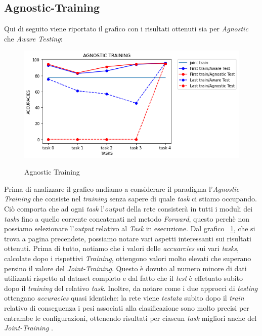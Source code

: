 \subsection{Agnostic-Training}
Qui di seguito  viene riportato il grafico con i risultati ottenuti sia per \textit{Agnostic} che \textit{Aware Testing}: 
\begin{figure}[ht]
\centering
\caption{Agnostic Training}
\includegraphics[width=\linewidth]{img/Agnostic_Agnostic-Aware.png}
\label{figure : Angostic_training}
\end{figure}
\newpage
Prima di analizzare il grafico  andiamo a considerare il paradigma l'\textit{Agnostic-Training} che consiste nel \textit{training}
senza sapere di quale \textit{task} ci stiamo occupando.
Ciò comporta che ad ogni \textit{task} l'\textit{output} della rete consisterà in tutti i moduli dei \textit{tasks} fino a quello corrente concatenati nel metodo \textit{Forward}, questo perchè non possiamo selezionare l'\textit{output} relativo al \textit{Task} in esecuzione.
\newline
Dal grafico ~\ref{figure : Angostic_training}, che si trova a pagina precendete, possiamo notare vari aspetti interessanti sui risultati ottenuti. Prima di tutto, notiamo che i valori delle \textit{accuarcies} sui vari \textit{tasks}, calcolate dopo i rispettivi \textit{Training}, ottengono valori molto elevati che superano persino il valore del \textit{Joint-Training}. Questo è dovuto al numero minore di dati utilizzati rispetto al dataset completo e dal fatto che il \textit{test} è effetuato subito  dopo il \textit{training} del relativo \textit{task}. Inoltre, da notare come i due approcci di \textit{testing} ottengano \textit{accuracies} quasi identiche: la rete viene \textit{testata} subito dopo il \textit{train} relativo di conseguenza i pesi associati alla clasificazione sono molto precisi per entrambe le configurazioni, ottenendo risultati per ciascun \textit{task} migliori anche del \textit{Joint-Training} .
